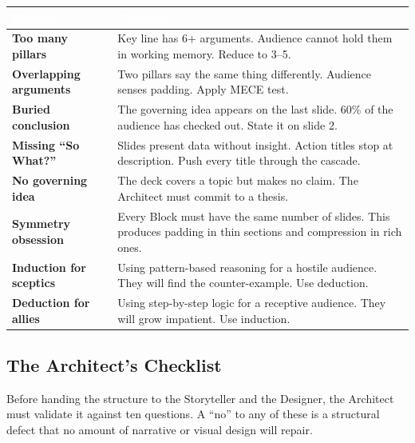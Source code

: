 \begin{center}
\small
{}
\begin{tabularx}{\textwidth}{>{\bfseries\color{heading}}p{3.8cm} X}
\toprule
\rowcolor{tableheader}
\textcolor{white}{\textbf{Mistake}} & \textcolor{white}{\textbf{Consequence}} \\
\midrule
Too many pillars & Key line has 6+ arguments. Audience cannot hold them in working memory. Reduce to 3--5. \\
Overlapping arguments & Two pillars say the same thing differently. Audience senses padding. Apply MECE test. \\
Buried conclusion & The governing idea appears on the last slide. 60\% of the audience has checked out. State it on slide 2. \\
\rowcolor{altrow}
Missing ``So What?'' & Slides present data without insight. Action titles stop at description. Push every title through the cascade. \\
No governing idea & The deck covers a topic but makes no claim. The Architect must commit to a thesis. \\
\rowcolor{altrow}
Symmetry obsession & Every Block must have the same number of slides. This produces padding in thin sections and compression in rich ones. \\
Induction for sceptics & Using pattern-based reasoning for a hostile audience. They will find the counter-example. Use deduction. \\
\rowcolor{altrow}
Deduction for allies & Using step-by-step logic for a receptive audience. They will grow impatient. Use induction. \\
\bottomrule
\end{tabularx}
\end{center}


\subsection{The Architect's Checklist}

Before handing the structure to the Storyteller and the Designer, the Architect must validate it against ten questions. A ``no'' to any of these is a structural defect that no amount of narrative or visual design will repair.


